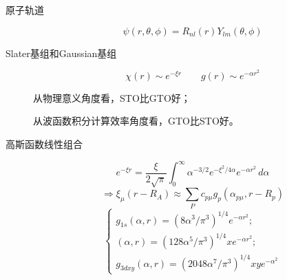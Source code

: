 \documentclass[12pt,a4paper,openany,twoside]{book}
\numberwithin{equation}{section}
\begin{document}
\begin{description}
    \item[原子轨道]
    \begin{equation}
      \psi(r,\theta,\phi)=R_{nl}(r)Y_{lm}(\theta,\phi)
    \end{equation}
  
    \item[Slater基组和Gaussian基组]
    \begin{equation}
    \chi(r)\sim e^{-\xi r} \qquad g(r)\sim e^{-\alpha r^2}
    \end{equation}
  
    从物理意义角度看，STO比GTO好；
  
    从波函数积分计算效率角度看，GTO比STO好。
  
    \item[高斯函数线性组合]
    \begin{equation}
    e^{-\xi r}=\frac{\xi}{2\sqrt{\pi}}\int_0^\infty \alpha^{-3/2} e^{-\xi^2/4\alpha}e^{-\alpha r^2} \, d\alpha
    \end{equation}
    \begin{equation}
    \Rightarrow \xi_\mu(r-R_A)\approx \sum_Pc_{p\mu}g_p(\alpha_{p\mu},r-R_p)
    \end{equation}
    \begin{equation}
    \begin{cases}
    g_{1s}(\alpha,r)=(8\alpha^3/\pi^3)^{1/4}e^{-\alpha r^2};\\
    (\alpha,r)=(128\alpha^5/\pi^3)^{1/4}xe^{-\alpha r^2};\\
    g_{3dxy}(\alpha,r)=(2048\alpha^7/\pi^3)^{1/4}xye^{-\alpha^2}
    \end{cases}
    \end{equation}
  \end{description}
  
\end{document}
